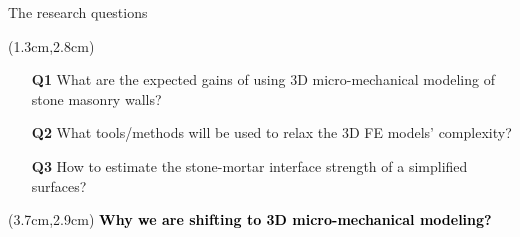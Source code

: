 \documentclass{EESD}
\begin{document}
\begin{frame}[t]{The research questions}\vspace{10pt}
    \begin{textblock*}{13cm}(1.3cm,2.8cm)
        \begin{itemize}
            \item[\textbf{Q1}] What are the expected gains of using 3D micro-mechanical modeling of stone masonry walls?\vspace{10pt}\pause
            \item[\textbf{Q2}] What tools/methods will be used to relax the 3D FE models' complexity?\vspace{20pt}\pause
            \item[\textbf{Q3}] How to estimate the stone-mortar interface strength of a simplified surfaces?
        \end{itemize}
    \end{textblock*}
\end{frame}

\begin{frame}[t]{}
\begin{textblock*}{10cm}(3.7cm,2.9cm)
\Huge\textbf{\textcolor{black}{Why we are shifting to 3D micro-mechanical modeling?}}
\end{textblock*}
\end{frame}
\usebackgroundtemplate{}
\end{document}
